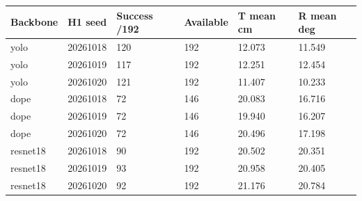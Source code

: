 \begin{tabular}{llllll}
\hline
Backbone & H1 seed & Success /192 & Available & T mean cm & R mean deg \\
\hline
yolo & 20261018 & 120 & 192 & 12.073 & 11.549 \\
yolo & 20261019 & 117 & 192 & 12.251 & 12.454 \\
yolo & 20261020 & 121 & 192 & 11.407 & 10.233 \\
dope & 20261018 & 72 & 146 & 20.083 & 16.716 \\
dope & 20261019 & 72 & 146 & 19.940 & 16.207 \\
dope & 20261020 & 72 & 146 & 20.496 & 17.198 \\
resnet18 & 20261018 & 90 & 192 & 20.502 & 20.351 \\
resnet18 & 20261019 & 93 & 192 & 20.958 & 20.405 \\
resnet18 & 20261020 & 92 & 192 & 21.176 & 20.784 \\
\hline
\end{tabular}
